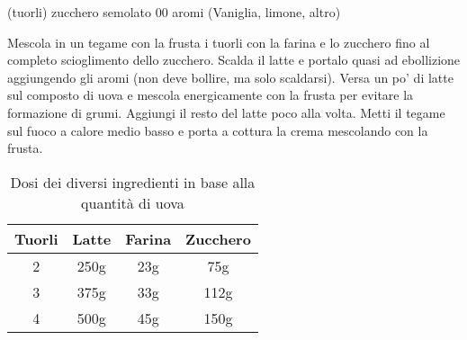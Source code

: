 \label{crema-pasticcera}
\begin{ingreds}
	 (tuorli)
	zucchero semolato
	 00
	aromi (Vaniglia, limone, altro)
\end{ingreds}
\begin{method}

	Mescola in un tegame con la frusta i tuorli con la farina e lo zucchero fino al completo scioglimento dello zucchero. Scalda il latte e portalo quasi ad ebollizione aggiungendo gli aromi (non deve bollire, ma solo scaldarsi). Versa un po' di latte sul composto di uova e mescola energicamente con la frusta per evitare la formazione di grumi. Aggiungi il resto del latte poco alla volta. Metti il tegame sul fuoco a calore medio basso e porta a cottura la crema mescolando con la frusta.

\begin{table}[h]
	\begin{center}
\begin{tabular}{cccc}
\toprule
	Tuorli	&	Latte	&	Farina	&	Zucchero \\
\midrule
	2	&	250g	&	23g	&	75g \\
	3	&	375g	&	33g	&	112g	\\
	4	&	500g	&	45g	&	150g	\\
\bottomrule
\end{tabular}
	\caption{Dosi dei diversi ingredienti in base alla quantità di uova}
	\end{center}
\end{table}


\end{method}



